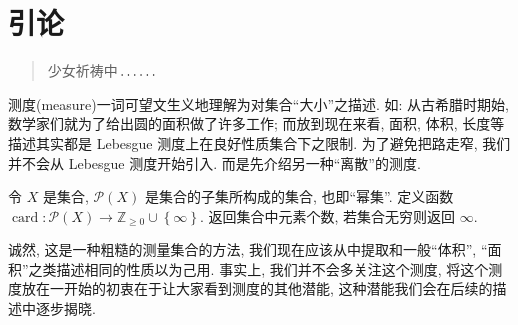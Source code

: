 \section{引\kern\ccwd 论}
\begin{quote}
    少女祈祷中\,$\mathinner{\ldotp \ldotp \ldotp\ldotp \ldotp \ldotp}$
\end{quote}

测度(measure)一词可望文生义地理解为对集合``大小''之描述. 如: 从古希腊时期始, 数学家们就为了给出圆的面积做了许多工作; 而放到现在来看, 面积, 体积, 长度等描述其实都是 Lebesgue 测度上在良好性质集合下之限制. 为了避免把路走窄, 我们并不会从 Lebesgue 测度开始引入. 而是先介绍另一种``离散''的测度.

\begin{defi}[计数测度]
    令 $X$ 是集合, $\mathcal P(X)$ 是集合的子集所构成的集合, 也即``幂集''. 定义函数 $\operatorname{card}:\mathcal P(X)\to \mathbb Z_{\geqslant 0}\cup\left\{ \infty \right\}$. 返回集合中元素个数, 若集合无穷则返回 $\infty$\enote.
\end{defi}
诚然, 这是一种粗糙的测量集合的方法, 我们现在应该从中提取和一般``体积'', ``面积''之类描述相同的性质以为己用. 事实上, 我们并不会多关注这个测度, 将这个测度放在一开始的初衷在于让大家看到测度的其他潜能, 这种潜能我们会在后续的描述中逐步揭晓.
